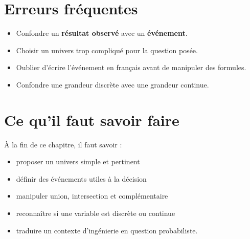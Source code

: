 \section{Erreurs fréquentes}

\begin{itemize}
    \item Confondre un \textbf{résultat observé} avec un \textbf{événement}.
    \item Choisir un univers trop compliqué pour la question posée.
    \item Oublier d'écrire l'événement en français avant de manipuler des formules.
    \item Confondre une grandeur discrète avec une grandeur continue.
\end{itemize}

\section{Ce qu'il faut savoir faire}

À la fin de ce chapitre, il faut savoir :
\begin{itemize}
    \item proposer un univers simple et pertinent  
    \item définir des événements utiles à la décision  
    \item manipuler union, intersection et complémentaire  
    \item reconnaître si une variable est discrète ou continue  
    \item traduire un contexte d'ingénierie en question probabiliste.
\end{itemize}

